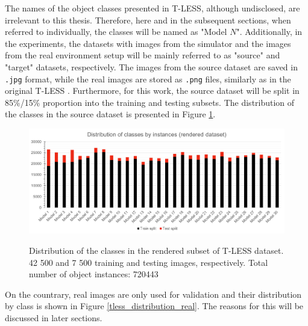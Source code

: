 \documentclass[english, 12pt, a4paper, elec, utf8, a-1b, online]{aaltothesis}
\begin{document}
The names of the object classes presented in T-LESS, although undisclosed, are irrelevant to this thesis. Therefore, here and in the subsequent sections, when referred to individually, the classes will be named as "Model $N$". Additionally, in the experiments, the datasets with images from the simulator and the images from the real environment setup will be mainly referred to as "source" and "target" datasets, respectively. The images from the source dataset are saved in \texttt{.jpg} format, while the real images are stored as \texttt{.png} files, similarly as in the original T-LESS \cite{hodan2017tless}. Furthermore, for this work, the source dataset will be split in 85\%/15\%  proportion into the training and testing subsets. The distribution of the classes in the source dataset is presented in Figure \ref{tless_distribution_rend}.  

\begin{figure}[htb]
	\begin{center}
		\includegraphics[width=14cm]{./rendered_distribution.png}
	\end{center}
	\caption{Distribution of the classes in the rendered subset of T-LESS dataset. 42 500 and 7 500 training and testing images, respectively. Total number of object instances: 720443}
	\begin{center}
		\label{tless_distribution_rend}
	\end{center}
\end{figure}
\FloatBarrier

On the countrary, real images are only used for validation and their distribution by class is shown in Figure \ref{tless_distribution_real}. The reasons for this will be discussed in later sections. 
\end{document}
